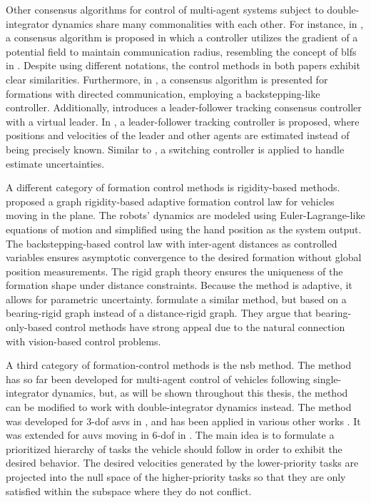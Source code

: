 Other consensus algorithms for control of multi-agent systems subject to double-integrator dynamics share many commonalities with each other. For instance, in \cite{miao_formation_2019}, a consensus algorithm is proposed in which a controller utilizes the gradient of a potential field to maintain communication radius, resembling the concept of \glspl{blf} in \cite{restrepo_tracking--formation_2022}. Despite using different notations, the control methods in both papers exhibit clear similarities. Furthermore, in \cite{montanez-molina_formation_2022}, a consensus algorithm is presented for formations with directed communication, employing a backstepping-like controller. Additionally, \cite{girejko_leader-following_2019} introduces a leader-follower tracking consensus controller with a virtual leader. In \cite{mohammadi_leader-following_2021}, a leader-follower tracking controller is proposed, where positions and velocities of the leader and other agents are estimated instead of being precisely known. Similar to \cite{restrepo_tracking--formation_2022}, a switching controller is applied to handle estimate uncertainties.

A different category of formation control methods is rigidity-based methods. \cite{cai_adaptive_2015} proposed a graph rigidity-based adaptive formation control law for vehicles moving in the plane. The robots' dynamics are modeled using Euler-Lagrange-like equations of motion and simplified using the hand position as the system output. The backstepping-based control law with inter-agent distances as controlled variables ensures asymptotic convergence to the desired formation without global position measurements. The rigid graph theory ensures the uniqueness of the formation shape under distance constraints. Because the method is adaptive, it allows for parametric uncertainty. \cite{li_adaptive_2021} formulate a similar method, but based on a bearing-rigid graph instead of a distance-rigid graph. They argue that bearing-only-based control methods have strong appeal due to the natural connection with vision-based control problems.

A third category of formation-control methods is the \gls{nsb} method. The method has so far been developed for multi-agent control of vehicles following single-integrator dynamics, but, as will be shown throughout this thesis, the method can be modified to work with double-integrator dynamics instead. The method was developed for 3-\gls{dof} \glspl{asv} in \cite{arrichiello_formation_2006}, and has been applied in various other works \citep{pereda_towards_2011, arrichiello_cooperative_2010, eek_formation_2021}. It was extended for \glspl{auv} moving in 6-\gls{dof} in \cite{matous_singularity-free_2022}. The main idea is to formulate a prioritized hierarchy of tasks the vehicle should follow in order to exhibit the desired behavior. The desired velocities generated by the lower-priority tasks are projected into the null space of the higher-priority tasks so that they are only satisfied within the subspace where they do not conflict.

